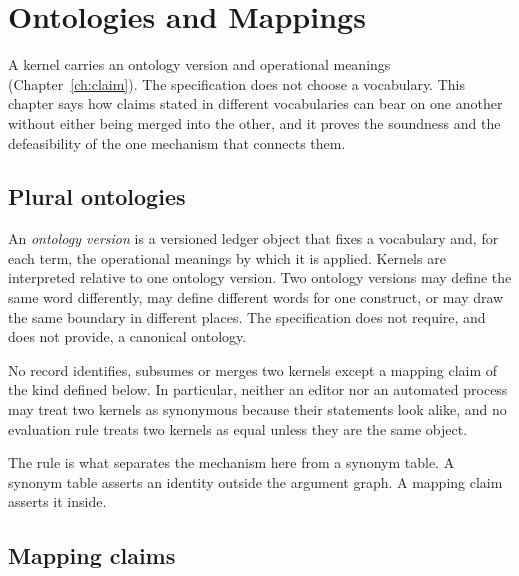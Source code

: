 \chapter{Ontologies and Mappings}\label{ch:ontology}

A kernel carries an ontology version and operational meanings (Chapter~\ref{ch:claim}). The specification does not choose a vocabulary. This chapter says how claims stated in different vocabularies can bear on one another without either being merged into the other, and it proves the soundness and the defeasibility of the one mechanism that connects them.

\section{Plural ontologies}\label{sec:plural}

An \emph{ontology version} is a versioned ledger object that fixes a vocabulary and, for each term, the operational meanings by which it is applied. Kernels are interpreted relative to one ontology version. Two ontology versions may define the same word differently, may define different words for one construct, or may draw the same boundary in different places. The specification does not require, and does not provide, a canonical ontology.

\begin{designrule}\label{rule:nomerge}
No record identifies, subsumes or merges two kernels except a mapping claim of the kind defined below. In particular, neither an editor nor an automated process may treat two kernels as synonymous because their statements look alike, and no evaluation rule treats two kernels as equal unless they are the same object.
\end{designrule}

The rule is what separates the mechanism here from a synonym table. A synonym table asserts an identity outside the argument graph. A mapping claim asserts it inside.

\section{Mapping claims}\label{sec:mappingclaims}


